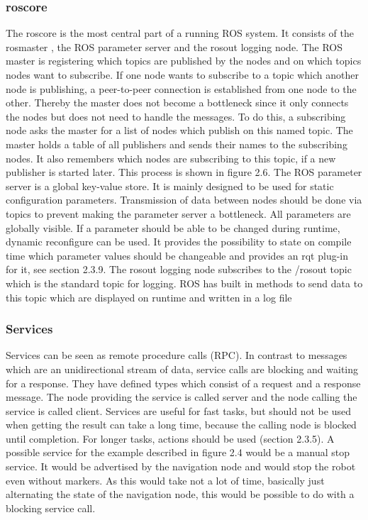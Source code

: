 \subsubsection*{roscore}
The
roscore
is the most central part of a running ROS system.  It consists of the
rosmaster
,  the  ROS  parameter  server  and  the
rosout
logging  node.   The  ROS
master is registering which topics are published by the nodes and on which topics
nodes want to subscribe.  If one node wants to subscribe to a topic which another
node is publishing,  a peer-to-peer connection is established from one node to the
other.  Thereby the master does not become a bottleneck since it only connects the
nodes but does not need to handle the messages.  To do this, a subscribing node asks
the master for a list of nodes which publish on this named topic.  The master holds
a  table  of  all  publishers  and  sends  their  names  to  the  subscribing  nodes.   It  also
remembers which nodes are subscribing to this topic, if a new publisher is started
later.  This process is shown in figure 2.6.
The ROS parameter server is a global key-value store.  It is mainly designed to
be  used  for  static  configuration  parameters.   Transmission  of  data  between  nodes
should be done via topics to prevent making the parameter server a bottleneck.  All
parameters are globally visible.  If a parameter should be able to be changed during
runtime,  dynamic reconfigure can be used.  It provides the possibility to state on
compile  time  which  parameter  values  should  be  changeable  and  provides  an
rqt
plug-in for it, see section 2.3.9.  The
rosout
logging node subscribes to the
/rosout
topic which is the standard topic for logging.  ROS has built in methods to send
data to this topic which are displayed on runtime and written in a log file

\subsubsection*{Services}
Services  can  be  seen  as  remote  procedure  calls  (RPC).  In  contrast  to  messages
which are an unidirectional stream of data,  service calls are blocking and waiting
for a response.  They have defined types which consist of a request and a response
message.  The node providing the service is called server and the node calling the
service  is  called  client.   Services  are  useful  for  fast  tasks,  but  should  not  be  used
when getting the result can take a long time,  because the calling node is blocked
until completion.  For longer tasks, actions should be used (section 2.3.5).  A possible
service for the example described in figure 2.4 would be a manual stop service.  It
would be advertised by the navigation node and would stop the robot even without
markers.  As this would take not a lot of time, basically just alternating the state of
the navigation node, this would be possible to do with a blocking service call.

